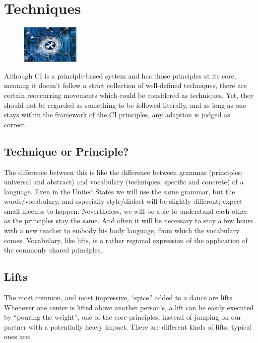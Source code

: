 \section{Techniques}\label{sec:techniques}

\begin{figure}
    \centering
    \includegraphics[width=0.25\textwidth]{images/techniques}
\end{figure}

Although CI is a principle-based system and has those principles at its core, meaning it doesn't follow a strict collection of well-defined techniques, there are certain reoccurring movements which could be considered as techniques.
Yet, they should not be regarded as something to be followed literally, and as long as one stays within the framework of the CI principles, any adaption is judged as correct.

\subsection{Technique or Principle?}\label{subsec:technique-or-principle?}

The difference between this is like the difference between grammar (principles; universal and abstract) and vocabulary (techniques; specific and concrete) of a language.
Even in the United States we will use the same grammar, but the words/vocabulary, and especially style/dialect will be slightly different; expect small hiccups to happen.
Nevertheless, we will be able to understand each other as the principles stay the same.
And often it will be necessary to stay a few hours with a new teacher to embody his body language, from which the vocabulary comes.
Vocabulary, like lifts, is a rather regional expression of the application of the commonly shared principles.

\subsection{Lifts}\label{subsec:lifts}

The most common, and most impressive, ``spice'' added to a dance are lifts.
Whenever one center is lifted above another person's, a lift can be easily executed by ``pouring the weight'', one of the core principles, instead of jumping on our partner with a potentially heavy impact.
There are different kinds of lifts; typical ones are:

